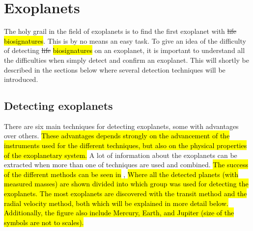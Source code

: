\section{Exoplanets}
\label{sec:exoplanets}

The holy grail in the field of exoplanets is to find the first exoplanet with \st{life}
\hl{biosignatures}. This is by no means an easy task. To give an idea of the difficulty of detecting
\st{life} \hl{biosignatures} on an exoplanet, it is important to understand all the difficulties
when simply detect and confirm an exoplanet. This will shortly be described in the sections below
where several detection techniques will be introduced.

\subsection{Detecting exoplanets}
\label{sec:detecting_exoplanets}

There are six main techniques for detecting exoplanets, some with advantages over others. \hl{These
advantages depends strongly on the advancement of the instruments used for the different techniques,
but also on the physical properties of the exoplanetary system.} A lot of information about the
exoplanets can be extracted when more than one of techniques are used and combined. \hl{The success
of the different methods can be seen in} , \hl{Where all the detected
planets (with measured masses) are shown divided into which group was used for detecting the
exoplanets. The most exoplanets are discovered with the transit method and the radial velocity
method, both which will be explained in more detail below. Additionally, the figure also include
Mercury, Earth, and Jupiter (size of the symbols are not to scales).}

